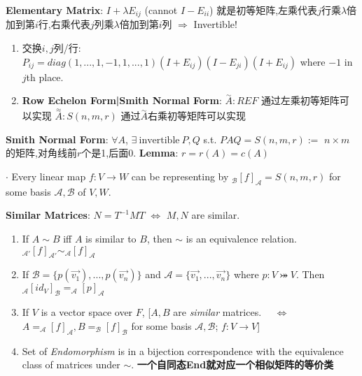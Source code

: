 \documentclass[9pt]{article}
\begin{document}
\textbf{Elementary Matrix}: $I+\lambda E_{ij}$ {\scriptsize (cannot $I-E_{ii}$)} {\footnotesize 就是初等矩阵,左乘代表$j$行乘$\lambda$倍加到第$i$行,右乘代表$j$列乘$\lambda$倍加到第$i$列} \quad $\Rightarrow$ \quad Invertible!

\begin{enumerate}[itemsep=-2pt, topsep=-2pt]
    \item {\footnotesize 交换$i,j$列/行}: $P_{ij}=diag(1,...,1,-1,1,...,1)(I+E_{ij})(I-E_{ji})(I+E_{ij})$ where $-1$ in $j$th place.
    \vspace{-2pt}
    \item \textbf{Row Echelon Form|Smith Normal Form}: $\stackrel{\sim}{A}:REF$ {\footnotesize 通过左乘初等矩阵可以实现} \quad \quad $\stackrel{\approx}{A}:S(n,m,r)$ {\footnotesize 通过$\stackrel{\sim}{A}$右乘初等矩阵可以实现}
\end{enumerate}

\textbf{Smith Normal Form}: {\small $\forall A$, $\exists \ \text{invertible} \ P,Q$ s.t. $PAQ=S(n,m,r):=$ {\footnotesize $n\times m$的矩阵,对角线前$r$个是1,后面0}. \quad \textbf{Lemma}: $r=r(A)=c(A)$}

$\cdot$ Every linear map $f:V\to W$ can be representing by $_{\mathcal{B}}[f]_{\mathcal{A}}=S(n,m,r)$ for some basis $\mathcal{A},\mathcal{B}$ of $V,W$.

\textbf{Similar Matrices}: $N=T^{-1}MT$ $\Leftrightarrow$ $M,N$ are similar. 

\begin{enumerate}[itemsep=-2pt, topsep=-2pt]
    \item If $A\sim B$ iff $A$ is similar to $B$, then $\sim$ is an equivalence relation. \quad \quad $_{\mathcal{A}'}[f]_{\mathcal{A'}}\sim_{\mathcal{A}}[f]_{\mathcal{A}}$
    \item If $\mathcal{B}=\{p(\vec{v_1}),...,p(\vec{v_n})\}$ and $\mathcal{A}=\{\vec{v_1},...,\vec{v_n}\}$ where $p:V\bij V$. Then $_{\mathcal{A}}[id_V]_{\mathcal{B}}=_{\mathcal{A}}[p]_{\mathcal{A}}$
    \item If $V$ is a vector space over $F$, [$A,B$ are \textit{similar} matrices. \ \ $\Leftrightarrow$ \ \ $A=_{\mathcal{A}}[f]_{\mathcal{A}},B=_{\mathcal{B}}[f]_{\mathcal{B}}$ for some basis $\mathcal{A},\mathcal{B}$; $f:V\to V$]
    \item {\small Set of \textit{Endomorphism} is in a bijection correspondence with the equivalence class of matrices under $\sim$. } {\scriptsize \textbf{一个自同态End就对应一个相似矩阵的等价类}}
\end{enumerate}
\end{document}
